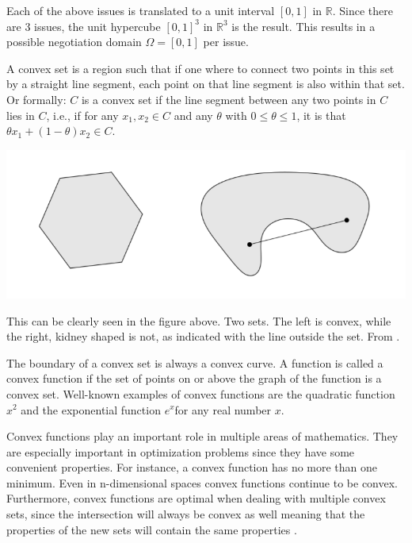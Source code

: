 Each of the above issues is translated to a unit interval $[0, 1]$ in $\mathbb{R}$. Since there are $3$ issues, the unit hypercube $[0, 1]^3$ in  $\mathbb{R}^3$ is the result. This results in a possible negotiation domain $\Omega = [0,1]$ per issue.
	\begin{definition*}[Convexity]

	\label{def:convex}
	A convex set is a region such that if one where to connect two points in this set by a straight line segment, each point on that line segment is also within that set. Or formally: $C$ is a convex set if the line segment between any two points in $C$ lies in $C$, i.e., if for any $x_1, x_2 \in C$ and any $\theta$ with $0 \leq \theta \leq 1$, it is that $\theta x_1 + (1 - \theta )x_2 \in C$.
	
	{\centering
		\includegraphics[width=0.7\linewidth]{img/convex}\par}
	
	This can be clearly seen in the figure above. Two sets. The left is convex, while the right, kidney shaped is not, as indicated with the line outside the set. From \citep{boyd2004convex}.
	
	The boundary of a convex set is always a convex curve. A function is called a convex function if the set of points on or above the graph of the function is a convex set. Well-known examples of convex functions are the quadratic function $x^{2}$ and the exponential function $e^{x} $for any real number $x$.
	
	Convex functions play an important role in multiple areas of mathematics. They are especially important in optimization problems since they have some convenient properties. For instance, a convex function has no more than one minimum. Even in n-dimensional spaces convex functions continue to be convex. Furthermore, convex functions are optimal when dealing with multiple convex sets, since the intersection will always be convex as well meaning that the properties of the new sets will contain the same properties  \citep{boyd2004convex}. 
	
\end{definition*}

